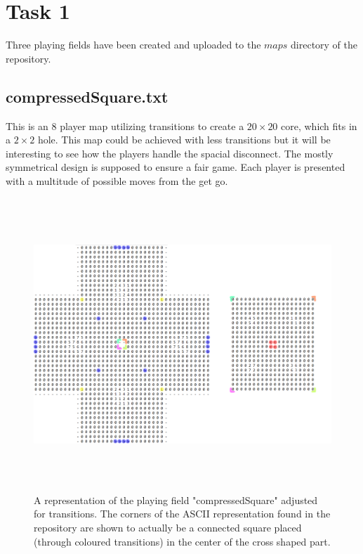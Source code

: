 \section{Task 1}
Three playing fields have been created and uploaded to the $maps$ directory of the repository.

\subsection{compressedSquare.txt}

This is an $8$ player map utilizing transitions to create a $20\times20$ core, which fits in a $2\times2$ hole. This map could be achieved with less transitions but it will be interesting to see how the players handle the spacial disconnect. The mostly symmetrical design is supposed to ensure a fair game. Each player is presented with a multitude of possible moves from the get go.        

\begin{figure}[H]
    \centering
    \includegraphics[height=11cm]{pictures/assignment1/compressedSquare.png}
    \caption{A representation of the playing field "compressedSquare" adjusted for transitions. The corners of the ASCII representation found in the repository are shown to actually be a connected square placed (through coloured transitions)  in the center of the cross shaped part.}
    \label{fig:compressedSquare}
\end{figure}



